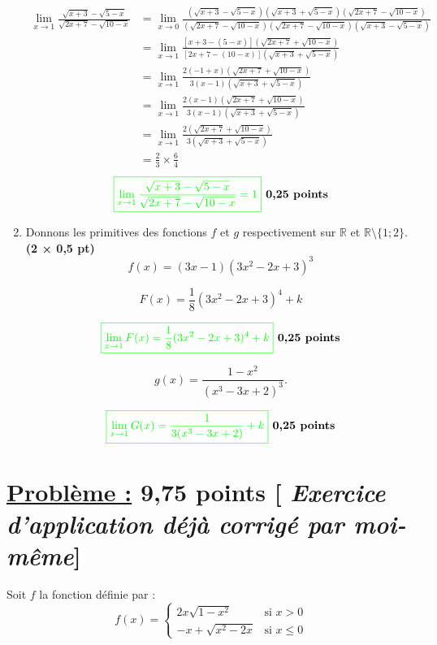 \documentclass[12pt,a4paper]{article}
\begin{document}
\begin{enumerate}
    \begin{align*}
    \lim_{x \to 1} \frac{\sqrt{x + 3} - \sqrt{5 - x}}{\sqrt{2x + 7} - \sqrt{10 - x}}&=\lim_{x \to 0}\frac{\left( \sqrt{x + 3} - \sqrt{5 - x}\right)\left( \sqrt{x + 3} + \sqrt{5 - x}\right)\left( \sqrt{2x + 7} - \sqrt{10 - x}\right) }{\left( \sqrt{2x + 7} - \sqrt{10 - x}\right) \left( \sqrt{2x + 7} - \sqrt{10 - x}\right) \left( \sqrt{x + 3} - \sqrt{5 - x}\right)}\\
    &=\lim_{x \to 1} \frac{\left[ x + 3 - (5 - x)\right]\left( \sqrt{2x + 7} + \sqrt{10 - x}\right) }{ \left[  2x + 7 - (10 - x) \right]  \left( \sqrt{x + 3} + \sqrt{5 - x}\right)}\\
    &=\lim_{x \to 1} \frac{2(-1+x)\left( \sqrt{2x + 7} + \sqrt{10 - x}\right) }{ 3( x - 1 )  \left( \sqrt{x + 3} + \sqrt{5 - x}\right)}\\
    &=\lim_{x \to 1} \frac{2(x-1)\left( \sqrt{2x + 7} + \sqrt{10 - x}\right) }{ 3( x - 1 )  \left( \sqrt{x + 3} + \sqrt{5 - x}\right)}\\
    &=\lim_{x \to 1} \frac{2\left( \sqrt{2x + 7} + \sqrt{10 - x}\right) }{ 3\left( \sqrt{x + 3} + \sqrt{5 - x}\right)}\\
    &=\frac{2}{3} \times \frac{6}{4}
    \end{align*}
\[
\textcolor{green}{\boxed{ \lim_{x \to 1} \frac{\sqrt{x + 3} - \sqrt{5 - x}}{\sqrt{2x + 7} - \sqrt{10 - x}}=1 }} \textbf{ 0,25 points}
\]
    \item Donnons les primitives des fonctions \(f\) et \(g\) respectivement sur \(\mathbb{R}\) et \(\mathbb{R} \setminus \{1; 2\}\). \textbf{(2 × 0,5 pt)}
    \[
    f(x) = (3x-1)(3x^2-2x+3)^3 
    \]

		\[
    F(x) =\frac{1}{8}(3x^2-2x+3)^4+k
    \] 
       
    \[
     \textcolor{green}{\boxed{ \lim_{x \to 1} F(x) =\frac{1}{8}(3x^2-2x+3)^4 + k }} \textbf{ 0,25 points}
    \]
    
    \[
    g(x) = \frac{1-x^2}{(x^3-3x+2)^3}.
    \]
    
    \[
     \textcolor{green}{\boxed{ \lim_{x \to 1} G(x) = \frac{1}{3(x^3-3x+2)} + k }} \textbf{ 0,25 points}
    \]
\end{enumerate}
\section*{\underline{Problème :} 9,75 points [\textit{ Exercice d'application déjà corrigé par moi-même}]} 

Soit $f$ la fonction définie par :
\[
f(x) =
\begin{cases} 
2x\sqrt{1 - x^2} & \text{si } x > 0 \\ 
-x + \sqrt{x^2 - 2x} & \text{si } x \leq 0 
\end{cases}
\]
\end{document}
